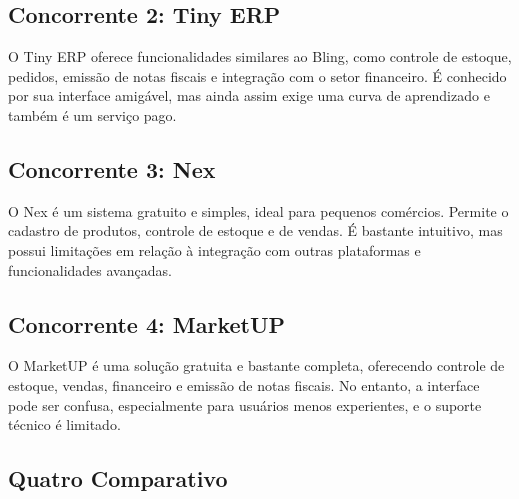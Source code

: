 \documentclass[
	12pt,				%
	openany,			%
	twoside,			%
	a4paper,			%
	english,			%
	brazil				%
	]{abntex2}
\begin{document}
\subsection{Concorrente 2: Tiny ERP}
O Tiny ERP oferece funcionalidades similares ao Bling, como controle de estoque, pedidos, emissão de notas fiscais e integração com o setor financeiro. É conhecido por sua interface amigável, mas ainda assim exige uma curva de aprendizado e também é um serviço pago.

\subsection{Concorrente 3: Nex}
O Nex é um sistema gratuito e simples, ideal para pequenos comércios. Permite o cadastro de produtos, controle de estoque e de vendas. É bastante intuitivo, mas possui limitações em relação à integração com outras plataformas e funcionalidades avançadas.

\subsection{Concorrente 4: MarketUP}
O MarketUP é uma solução gratuita e bastante completa, oferecendo controle de estoque, vendas, financeiro e emissão de notas fiscais. No entanto, a interface pode ser confusa, especialmente para usuários menos experientes, e o suporte técnico é limitado.

\subsection{Quatro Comparativo}
\end{document}
